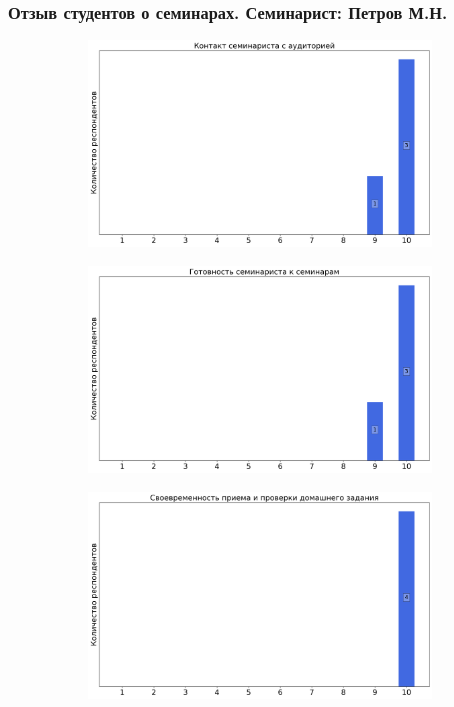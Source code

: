     \subsubsection{Отзыв студентов о семинарах. Семинарист: Петров М.Н.}
		\begin{figure}[H]
			\centering
			\begin{subfigure}[b]{0.45\textwidth}
				\centering
				\includegraphics[width=\textwidth]{images/3 course/Вычислительная математика/seminarists-marks-Петров М.Н.-0.png}
			\end{subfigure}
			\begin{subfigure}[b]{0.45\textwidth}
				\centering
				\includegraphics[width=\textwidth]{images/3 course/Вычислительная математика/seminarists-marks-Петров М.Н.-1.png}
			\end{subfigure}
			\begin{subfigure}[b]{0.45\textwidth}
				\centering
				\includegraphics[width=\textwidth]{images/3 course/Вычислительная математика/seminarists-marks-Петров М.Н.-2.png}

\end{subfigure}
\end{figure}
